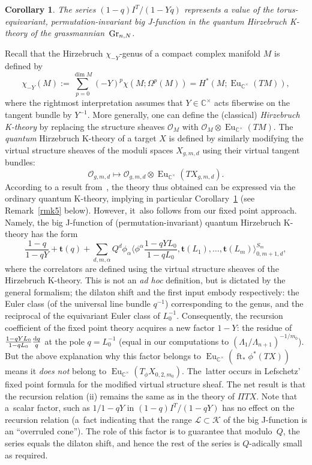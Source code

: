 \documentclass[10pt,a4paper]{amsart}
\numberwithin{equation}{section}
\newtheorem{Corollary}[Theorem]{Corollary}
\def\K{\mathcal K}
\def\L{\mathcal L}
\def\O{\mathcal O}
\def\CC{\mathbb C}
\def\t{{\mathbf t}}
\def\lan{\langle}
\def\ran{\rangle}
\def\ft{\operatorname{ft}}
\def\Eu{\operatorname{Eu}}
\theoremstyle{definition}
\theoremstyle{plain}
\begin{document}
\begin{Corollary}\label{cor1}
The series $(1-q) I^T /(1-Yq)$ represents a value of the torus-equivariant, per\-mu\-ta\-tion-invariant big J-function in the quantum Hirzebruch K-theory of the grassman\-nian~${\rm Gr}_{n,N}$.
\end{Corollary}

Recall that the Hirzebruch $\chi_{-Y}$-genus of a compact complex manifold $M$ is defined by
\[
\chi_{-Y}(M):=\sum_{p=0}^{\dim M} (-Y)^p \chi (M; \Omega^p(M)) = H^*(M; \Eu_{\CC^{\times}}(TM)),
\]
where the rightmost interpretation assumes that $Y\in \CC^{\times}$ acts fiberwise on the tangent bundle by $Y^{-1}$. More generally, one can define the (classical) {\em Hirzebruch K-theory} by replacing the structure sheaves $\O_M$ with $\O_M\otimes \Eu_{\CC^{\times}}(TM)$. The {\em quantum} Hirzebruch K-theory of a target $X$ is defined by similarly modifying the virtual structure sheaves of the moduli spaces $X_{g,m,d}$ using their virtual tangent bundles:
\[
\O_{g,m,d} \mapsto \O_{g,m,d} \otimes \Eu_{\CC^{\times}}(T X_{g,m,d}).
\]
According to a result from~\cite{G-H}, the theory thus obtained can be expressed via the ordinary quantum K-theory, implying in particular Corollary~\ref{cor1} (see Remark~\ref{rmk5} below). However, it~also follows from our fixed point approach. Namely, the big J-function of (permutation-invariant) quantum Hirzebruch K-theory has the form
\[
\frac{1-q}{1-qY}+\t(q)+\sum_{d,m,\alpha}Q^d\phi_{\alpha}\bigg\lan \phi^{\alpha} \frac{1-qYL_0}{1-qL_0},\t(L_1),\dots, \t(L_m)\bigg\ran^{S_m}_{0,m+1,d},
\]
where the correlators are defined using the virtual structure sheaves of the Hirzebruch K-theory. This is not an {\em ad hoc} definition, but is dictated by the general formalism; the dilaton shift and the first input embody respectively: the Euler class (of the universal line bundle $q^{-1}$) corresponding to the genus, and the reciprocal of the equivariant Euler class of $L_0^{-1}$. Consequently, the recursion coefficient of the fixed point theory acquires a new factor $1-Y$: the residue of $\frac{1-qYL_0}{1-qL_0} \frac{{\rm d}q}{q}$ at the pole $q=L_0^{-1}$ (equal in our computations to $(\Lambda_1/\Lambda_{n+1})^{-1/m_0}$). But the above explanation why this factor belongs to $\Eu_{\CC^{\times}}(\ft_*\phi^*(TX))$ means it {\em does not} belong to $\Eu_{\CC^{\times}}(T_{\phi}X_{0,2,m_0})$. The~latter occurs in Lefschetz' fixed point formula for the modified virtual structure sheaf. The net result is that the recursion relation (ii) remains the same as in the theory of $\Pi T X$. Note that a~scalar factor, such as $1/1-qY$ in $(1-q) I^T/(1-qY)$ has no effect on the recursion relation (a~fact indicating that the range $\L\subset \K$ of the big J-function is an ``overruled cone''). The role of this factor is to guarantee that modulo~$Q$, the series equals the dilaton shift, and hence the rest of the series is $Q$-adically small as required.
\end{document}
